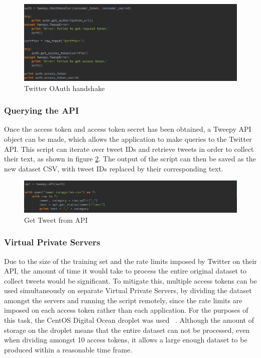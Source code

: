 \begin{figure}[H]
	\centering
	\includegraphics[width=\textwidth]{Images/Implementation/oauth}
	\caption{Twitter OAuth handshake} \label{fig:oauth}
\end{figure}

\subsubsection{Querying the API}
Once the access token and access token secret has been obtained, a Tweepy API object can be made, which allows the application to make queries to the Twitter API. This script can iterate over tweet IDs and retrieve tweets in order to collect their text, as shown in figure \ref{fig:get-tweets}. The output of the script can then be saved as the new dataset CSV, with tweet IDs replaced by their corresponding text.

\begin{figure}[H]
	\centering
	\includegraphics[width=\textwidth]{Images/Implementation/get-tweets}
	\caption{Get Tweet from API} \label{fig:get-tweets}
\end{figure}

\subsubsection{Virtual Private Servers}
Due to the size of the training set and the rate limits imposed by Twitter on their API, the amount of time it would take to process the entire original dataset to collect tweets would be significant. To mitigate this, multiple access tokens can be used simultaneously on separate Virtual Private Servers, by dividing the dataset amongst the servers and running the script remotely, since the rate limits are imposed on each access token rather than each application. For the purposes of this task, the CentOS Digital Ocean droplet was used ~\cite{DigitalOcean:Home}. Although the amount of storage on the droplet means that the entire dataset can not be processed, even when dividing amongst 10 access tokens, it allows a large enough dataset to be produced within a reasonable time frame.

